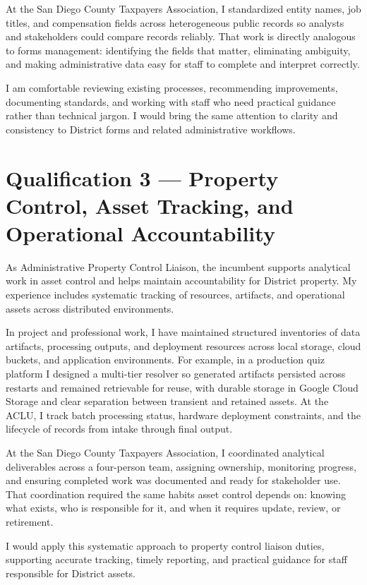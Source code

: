 \documentclass[letterpaper,11pt]{article}
\begin{document}
At the San Diego County Taxpayers Association, I standardized entity names, job titles, and compensation fields
across heterogeneous public records so analysts and stakeholders could compare records reliably. That work is
directly analogous to forms management: identifying the fields that matter, eliminating ambiguity, and making
administrative data easy for staff to complete and interpret correctly.

I am comfortable reviewing existing processes, recommending improvements, documenting standards, and working with
staff who need practical guidance rather than technical jargon. I would bring the same attention to clarity and
consistency to District forms and related administrative workflows.

\section{Qualification 3 --- Property Control, Asset Tracking, and Operational Accountability}

As Administrative Property Control Liaison, the incumbent supports analytical work in asset control and helps maintain
accountability for District property. My experience includes systematic tracking of resources, artifacts, and
operational assets across distributed environments.

In project and professional work, I have maintained structured inventories of data artifacts, processing outputs,
and deployment resources across local storage, cloud buckets, and application environments. For example, in a
production quiz platform I designed a multi-tier resolver so generated artifacts persisted across restarts and
remained retrievable for reuse, with durable storage in Google Cloud Storage and clear separation between transient
and retained assets. At the ACLU, I track batch processing status, hardware deployment constraints, and the
lifecycle of records from intake through final output.

At the San Diego County Taxpayers Association, I coordinated analytical deliverables across a four-person team,
assigning ownership, monitoring progress, and ensuring completed work was documented and ready for stakeholder use.
That coordination required the same habits asset control depends on: knowing what exists, who is responsible for it,
and when it requires update, review, or retirement.

I would apply this systematic approach to property control liaison duties, supporting accurate tracking, timely
reporting, and practical guidance for staff responsible for District assets.
\end{document}
